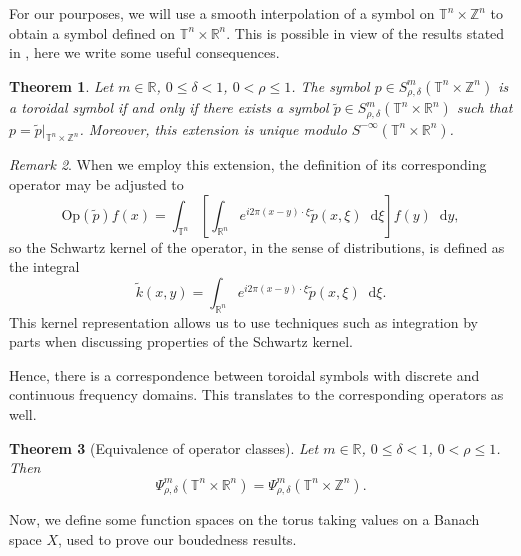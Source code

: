 \documentclass[12pt, reqno]{amsart}
\newtheorem{theorem}{Theorem}[section]
\theoremstyle{definition}
\theoremstyle{remark}
\newtheorem{remark}[theorem]{Remark}
\numberwithin{equation}{section}
\newcommand*\diff{\mathop{}\!\mathrm{d}}
\begin{document}
For our pourposes, we will use a smooth interpolation of a symbol on $\mathbb{T}^n \times \mathbb{Z}^n $ to obtain a symbol defined on $\mathbb{T}^n \times \mathbb{R}^n $. This is possible in view of the results stated in \cite[section~4.5]{ruzhansky-turunen}, here we write some useful consequences.

\begin{theorem}
    Let $m \in \mathbb{R}$, $0\leq\delta<1$, $0< \rho \leq 1$. The symbol $p \in S^m_{\rho,\delta} (\mathbb{T}^n\times \mathbb{Z}^n) $ is a toroidal symbol if and only if there exists a symbol $\tilde{p} \in S^m_{\rho,\delta} (\mathbb{T}^n\times \mathbb{R}^n) $ such that $p = \tilde{p}|_{\mathbb{T}^n\times \mathbb{Z}^n} $. Moreover, this extension is unique modulo $S^{-\infty}(\mathbb{T}^n\times \mathbb{R}^n)$.
\end{theorem}

\begin{remark}
    When we employ this extension, the definition of its corresponding operator may be adjusted to 
    \begin{equation*}
        \mathrm{Op}(\tilde{p})f(x) = \int_{\mathbb{T}^n} \left[ \int_{\mathbb{R}^n} e^{i2\pi (x-y) \cdot \xi} \tilde{p}(x, \xi)\diff \xi \right] f(y) \diff y ,
    \end{equation*}
    so the Schwartz kernel of the operator, in the sense of distributions, is defined as the integral 
    \begin{equation*}
        \tilde{k}(x, y) = \int_{\mathbb{R}^n} e^{i2\pi (x-y) \cdot \xi} \tilde{p}(x, \xi)\diff \xi.
    \end{equation*}
    This kernel representation allows us to use techniques such as integration by parts when discussing properties of the Schwartz kernel.
\end{remark}
Hence, there is a correspondence between toroidal symbols with discrete and continuous frequency domains. This translates to the corresponding operators as well.
\begin{theorem}[Equivalence of operator classes]
    Let $m \in \mathbb{R}$, $0\leq\delta<1$, $0< \rho \leq 1$. Then 
        \begin{equation*}
            \Psi^m_{\rho,\delta}(\mathbb{T}^n\times \mathbb{R}^n) = \Psi^m_{\rho,\delta}(\mathbb{T}^n\times \mathbb{Z}^n).
        \end{equation*}
\end{theorem}
Now, we define some function spaces on the torus taking values on a Banach space $X$, used to prove our boudedness results.
\end{document}
